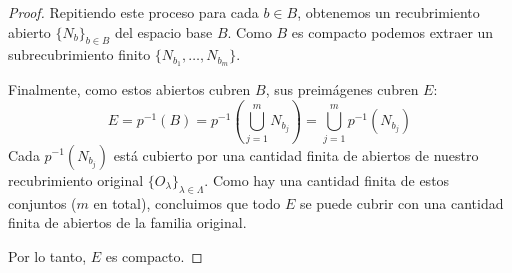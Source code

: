 \documentclass{article}
\theoremstyle{plain}
\theoremstyle{definition}
\begin{document}
\begin{proof}
    Repitiendo este proceso para cada \( b \in B \), obtenemos un recubrimiento abierto \( {\{ N_b \}}_{b \in B} \) del espacio base \( B \).
    Como \( B \) es compacto podemos extraer un subrecubrimiento finito \( \{ N_{b_1}, \ldots, N_{b_m} \} \).

    Finalmente, como estos abiertos cubren \( B \), sus preimágenes cubren \( E \):
    \[ E = p^{-1}(B) = p^{-1}\left( \bigcup_{j=1}^{m} N_{b_j} \right) = \bigcup_{j=1}^{m} p^{-1}(N_{b_j}) \]
    Cada \( p^{-1}(N_{b_j}) \) está cubierto por una cantidad finita de abiertos de nuestro recubrimiento original \( {\{ O_\lambda \}}_{\lambda \in \Lambda} \). Como hay una cantidad finita de estos conjuntos (\( m \) en total), concluimos que todo \( E \) se puede cubrir con una cantidad finita de abiertos de la familia original.

    Por lo tanto, \( E \) es compacto.
\end{proof}

\clearpage
\end{document}

